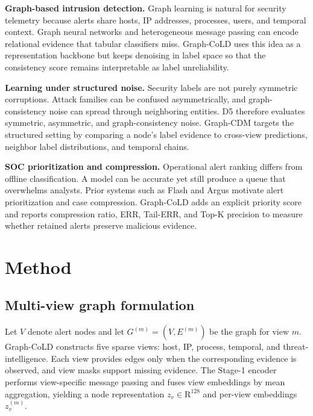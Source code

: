 \documentclass[11pt]{article}
\begin{document}
\textbf{Graph-based intrusion detection.}
Graph learning is natural for security telemetry because alerts share hosts, IP addresses, processes, users, and temporal context. Graph neural networks and heterogeneous message passing can encode relational evidence that tabular classifiers miss. Graph-CoLD uses this idea as a representation backbone but keeps denoising in label space so that the consistency score remains interpretable as label unreliability.

\textbf{Learning under structured noise.}
Security labels are not purely symmetric corruptions. Attack families can be confused asymmetrically, and graph-consistency noise can spread through neighboring entities. D5 therefore evaluates symmetric, asymmetric, and graph-consistency noise. Graph-CDM targets the structured setting by comparing a node's label evidence to cross-view predictions, neighbor label distributions, and temporal chains.

\textbf{SOC prioritization and compression.}
Operational alert ranking differs from offline classification. A model can be accurate yet still produce a queue that overwhelms analysts. Prior systems such as Flash and Argus motivate alert prioritization and case compression. Graph-CoLD adds an explicit priority score and reports compression ratio, ERR, Tail-ERR, and Top-K precision to measure whether retained alerts preserve malicious evidence.

\section{Method}
\subsection{Multi-view graph formulation}
Let $V$ denote alert nodes and let $G^{(m)}=(V,E^{(m)})$ be the graph for view $m$. Graph-CoLD constructs five sparse views: host, IP, process, temporal, and threat-intelligence. Each view provides edges only when the corresponding evidence is observed, and view masks support missing evidence. The Stage-1 encoder performs view-specific message passing and fuses view embeddings by mean aggregation, yielding a node representation $z_v\in\mathrm{R}^{128}$ and per-view embeddings $z_v^{(m)}$.
\end{document}
